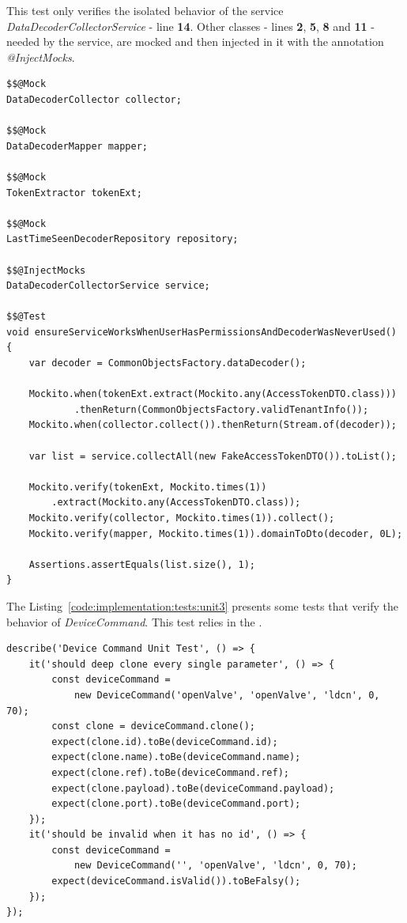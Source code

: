 This test only verifies the isolated behavior of the service \textit{DataDecoderCollectorService} - line \textbf{14}. Other classes - lines \textbf{2}, \textbf{5}, \textbf{8} and \textbf{11} - needed by the service, are mocked and then injected in it with the annotation \textit{@InjectMocks}.

\begin{lstlisting}[style=Java, caption=Unit Test - Data Decoder Backend Container, label={code:implementation:tests:unit2}]
$$@Mock
DataDecoderCollector collector;

$$@Mock
DataDecoderMapper mapper;

$$@Mock
TokenExtractor tokenExt;

$$@Mock
LastTimeSeenDecoderRepository repository;

$$@InjectMocks
DataDecoderCollectorService service;

$$@Test
void ensureServiceWorksWhenUserHasPermissionsAndDecoderWasNeverUsed() {
    var decoder = CommonObjectsFactory.dataDecoder();

    Mockito.when(tokenExt.extract(Mockito.any(AccessTokenDTO.class)))
            .thenReturn(CommonObjectsFactory.validTenantInfo());
    Mockito.when(collector.collect()).thenReturn(Stream.of(decoder));

    var list = service.collectAll(new FakeAccessTokenDTO()).toList();

    Mockito.verify(tokenExt, Mockito.times(1))
        .extract(Mockito.any(AccessTokenDTO.class));
    Mockito.verify(collector, Mockito.times(1)).collect();
    Mockito.verify(mapper, Mockito.times(1)).domainToDto(decoder, 0L);

    Assertions.assertEquals(list.size(), 1);
}
\end{lstlisting}

The Listing~\ref{code:implementation:tests:unit3} presents some tests that verify the behavior of \textit{DeviceCommand}. This test relies in the .

\begin{lstlisting}[style=javascript, caption=Unit Test - Device Management Frontend Model Library, label={code:implementation:tests:unit3}]
describe('Device Command Unit Test', () => {
    it('should deep clone every single parameter', () => {
        const deviceCommand =
            new DeviceCommand('openValve', 'openValve', 'ldcn', 0, 70);
        const clone = deviceCommand.clone();
        expect(clone.id).toBe(deviceCommand.id);
        expect(clone.name).toBe(deviceCommand.name);
        expect(clone.ref).toBe(deviceCommand.ref);
        expect(clone.payload).toBe(deviceCommand.payload);
        expect(clone.port).toBe(deviceCommand.port);
    });
    it('should be invalid when it has no id', () => {
        const deviceCommand =
            new DeviceCommand('', 'openValve', 'ldcn', 0, 70);
        expect(deviceCommand.isValid()).toBeFalsy();
    });
});
\end{lstlisting}

